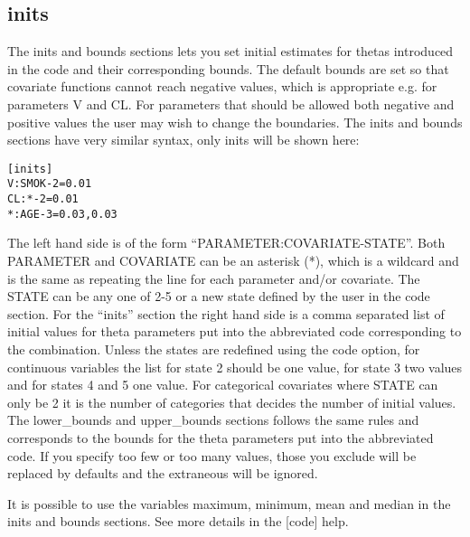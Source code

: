 \documentclass[a4paper,12pt]{article}
\begin{document}
\subsection{inits}
The inits and bounds sections lets you set initial estimates for thetas introduced in the code and their corresponding bounds. The default bounds are set so that covariate functions cannot reach negative values, which is appropriate e.g. for parameters V and CL. For parameters that should be allowed both negative and positive values the user may wish to change the boundaries. The inits and bounds sections have very similar syntax, only inits will be shown here:

\begin{verbatim}
[inits]
V:SMOK-2=0.01
CL:*-2=0.01
*:AGE-3=0.03,0.03
\end{verbatim}

The left hand side is of the form “PARAMETER:COVARIATE-STATE”. Both PARAMETER and COVARIATE can be an asterisk (*), which is a wildcard and is the same as repeating the line for each parameter and/or covariate. The STATE can be any one of 2-5 or a new state defined by the user in the code section. For the “inits” section the right hand side is a comma separated list of initial values for theta parameters put into the abbreviated code corresponding to the combination. Unless the states are redefined using the code option, for continuous variables the list for state 2 should be one value, for state 3 two values and for states 4 and 5 one value. For categorical covariates where STATE can only be 2 it is the number of categories that decides the number of initial values. The lower\_bounds and upper\_bounds sections follows the same rules and corresponds to the bounds for the theta parameters put into the abbreviated code. If you specify too few or too many values, those you exclude will be replaced by defaults and the extraneous will be ignored. 

It is possible to use the variables maximum, minimum, mean and median in the inits and bounds sections. See more details in the [code] help. 
\end{document}
